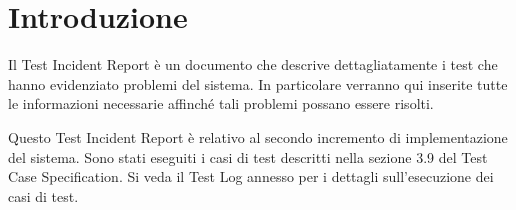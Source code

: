 \chapter{Introduzione}
Il Test Incident Report è un documento che descrive dettagliatamente i test che hanno evidenziato problemi del sistema. In particolare verranno qui inserite tutte le informazioni necessarie affinché tali problemi possano essere risolti.

Questo Test Incident Report è relativo al secondo incremento di implementazione del sistema. Sono stati eseguiti i casi di test descritti nella sezione 3.9 del Test Case Specification. Si veda il Test Log annesso per i dettagli sull'esecuzione dei casi di test.